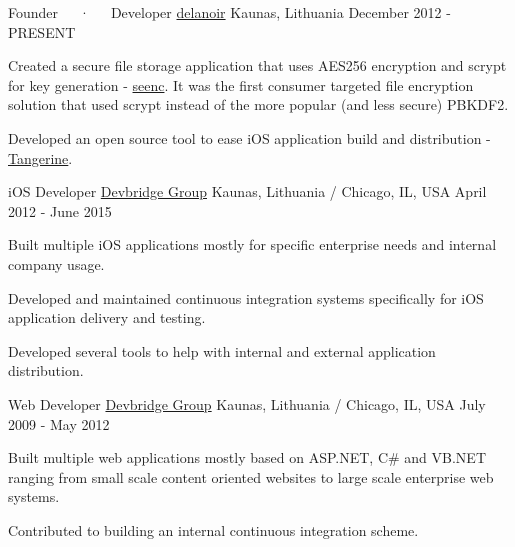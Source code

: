 \begin{cventries}
  \cventry
    {Founder~~~·~~~Developer} %
    {\href{https://delanoir.com}{delanoir}} %
    {Kaunas, Lithuania} %
    {December 2012 - PRESENT} %
    {
      \begin{cvitems} %
        \item  Created a secure file storage application that uses AES256 encryption and scrypt for key generation - \href{http://appstore.com/seenc}{seenc}. It was the first consumer targeted file encryption solution that used scrypt instead of the more popular (and less secure) PBKDF2.
        \item Developed an open source tool to ease iOS application build and distribution - \href{http://github.com/carlossless/tangerine}{Tangerine}.
      \end{cvitems}
    }

  \cventry
    {iOS Developer} %
    {\href{https://devbridge.com}{Devbridge Group}} %
    {Kaunas, Lithuania / Chicago, IL, USA} %
    {April 2012 - June 2015} %
    {
      \begin{cvitems} %
        \item {Built multiple iOS applications mostly for specific enterprise needs and internal company usage.}
        \item {Developed and maintained continuous integration systems specifically for iOS application delivery and testing.}
        \item {Developed several tools to help with internal and external application distribution.}
      \end{cvitems}
    }

  \cventry
    {Web Developer} %
    {\href{https://devbridge.com}{Devbridge Group}} %
    {Kaunas, Lithuania / Chicago, IL, USA} %
    {July 2009 - May 2012} %
    {
      \begin{cvitems} %
        \item {Built multiple web applications mostly based on ASP.NET, C\# and VB.NET ranging from small scale content oriented websites to large scale enterprise web systems.}
        \item {Contributed to building an internal continuous integration scheme.}
      \end{cvitems}
    }

\end{cventries}
